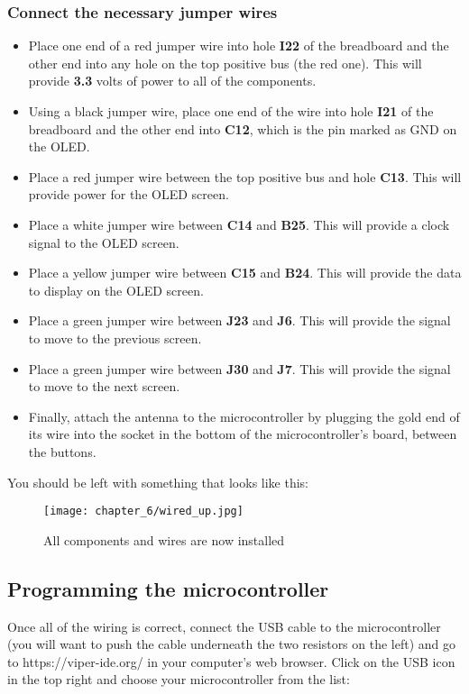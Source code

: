 \subsubsection{Connect the necessary jumper wires}
\begin{itemize}
    \item Place one end of a red jumper wire into hole \textbf{I22} of the breadboard and the other end into
    any hole on the top positive bus (the red one). This will provide \textbf{3.3} volts of power to all of the components.
    \item Using a black jumper wire, place one end of the wire into hole \textbf{I21} of the breadboard and the other
    end into \textbf{C12}, which is the pin marked as GND on the OLED.
    \item Place a red jumper wire between the top positive bus and hole \textbf{C13}. This will provide power for the OLED screen.
    \item Place a white jumper wire between \textbf{C14} and \textbf{B25}. This will provide a clock signal to the OLED screen.
    \item Place a yellow jumper wire between \textbf{C15} and \textbf{B24}. This will provide the data to display on the OLED screen.
    \item Place a green jumper wire between \textbf{J23} and \textbf{J6}. This will provide the signal to move to the previous screen.
    \item Place a green jumper wire between \textbf{J30} and \textbf{J7}. This will provide the signal to move to the next screen.
    \item Finally, attach the antenna to the microcontroller by plugging the gold end of its wire into the socket in the bottom of
    the microcontroller's board, between the buttons.
\end{itemize}

You should be left with something that looks like this:
\begin{figure}[H]
    \centering
    \texttt{[image: chapter\_6/wired\_up.jpg]}
    \caption{All components and wires are now installed}
\end{figure}

\subsection{Programming the microcontroller}
Once all of the wiring is correct, connect the USB cable to the microcontroller (you will want to push the cable underneath the
two resistors on the left) and go to https://viper-ide.org/ in your computer's web browser. Click on the USB icon in the top
right and choose your microcontroller from the list:

